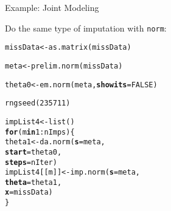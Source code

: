 \documentclass[10pt]{beamer}\usepackage[]{graphicx}\usepackage[]{color}
\makeatletter
\newcommand{\hlnum}[1]{\textcolor[rgb]{0.69,0.494,0}{#1}}%
\newcommand{\hlopt}[1]{\textcolor[rgb]{0,0,0}{#1}}%
\newcommand{\hlstd}[1]{\textcolor[rgb]{0,0,0}{#1}}%
\newcommand{\hlkwa}[1]{\textcolor[rgb]{0,0,0}{\textbf{#1}}}%
\newcommand{\hlkwb}[1]{\textcolor[rgb]{0,0.341,0.682}{#1}}%
\newcommand{\hlkwc}[1]{\textcolor[rgb]{0,0,0}{\textbf{#1}}}%
\newcommand{\hlkwd}[1]{\textcolor[rgb]{0.004,0.004,0.506}{#1}}%
\newenvironment{kframe}{%
 \def\at@end@of@kframe{}%
 \ifinner\ifhmode%
  \def\at@end@of@kframe{\end{minipage}}%
  \begin{minipage}{\columnwidth}%
 \fi\fi%
 \def\FrameCommand##1{\hskip\@totalleftmargin \hskip-\fboxsep
 \colorbox{shadecolor}{##1}\hskip-\fboxsep
     \hskip-\linewidth \hskip-\@totalleftmargin \hskip\columnwidth}%
 \MakeFramed {\advance\hsize-\width
   \@totalleftmargin\z@ \linewidth\hsize
   \@setminipage}}%
 {\par\unskip\endMakeFramed%
 \at@end@of@kframe}
\newenvironment{knitrout}{}{} %
\makeatother
\begin{document}
\begin{frame}[fragile]{Example: Joint Modeling}
  
  Do the same type of imputation with \texttt{norm}:
  
\begin{knitrout}\footnotesize
{}\color{fgcolor}\begin{kframe}
\begin{alltt}
\hlstd{missData} \hlkwb{<-} \hlkwd{as.matrix}\hlstd{(missData)}

\hlstd{meta}   \hlkwb{<-} \hlkwd{prelim.norm}\hlstd{(missData)}
\end{alltt}


{\ttfamily\noindent\bfseries{}}\begin{alltt}
\hlstd{theta0} \hlkwb{<-} \hlkwd{em.norm}\hlstd{(meta,} \hlkwc{showits} \hlstd{=} \hlnum{FALSE}\hlstd{)}
\end{alltt}


{\ttfamily\noindent\bfseries{}}\begin{alltt}
\hlkwd{rngseed}\hlstd{(}\hlnum{235711}\hlstd{)}
\end{alltt}


{\ttfamily\noindent\bfseries{}}\begin{alltt}
\hlstd{impList4} \hlkwb{<-} \hlkwd{list}\hlstd{()}
\hlkwa{for}\hlstd{(m} \hlkwa{in} \hlnum{1} \hlopt{:} \hlstd{nImps) \{}
    \hlstd{theta1} \hlkwb{<-} \hlkwd{da.norm}\hlstd{(}\hlkwc{s}     \hlstd{= meta,}
                      \hlkwc{start} \hlstd{= theta0,}
                      \hlkwc{steps} \hlstd{= nIter)}
    \hlstd{impList4[[m]]} \hlkwb{<-} \hlkwd{imp.norm}\hlstd{(}\hlkwc{s}     \hlstd{= meta,}
                              \hlkwc{theta} \hlstd{= theta1,}
                              \hlkwc{x}     \hlstd{= missData)}
\hlstd{\}}
\end{alltt}


{\ttfamily\noindent\bfseries{}}\end{kframe}
\end{knitrout}

\end{frame}
\end{document}
